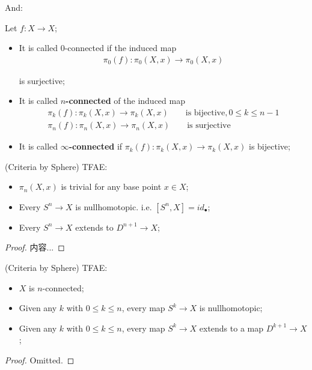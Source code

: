 \documentclass[Total.tex]{subfiles}
\begin{document}
			And:
			\begin{Def} Let $f:X\rightarrow X$;
				\begin{itemize}
					\item It is called $0$-connected if the induced map 
					\begin{gather*}
						\pi_0(f):\pi_0(X,x)\rightarrow \pi_0(X,x)
					\end{gather*}
					
					is surjective;
					\item It is called \textbf{$n$-connected} of the induced map
					\begin{gather*}
						\pi_k(f):\pi_k(X,x)\rightarrow \pi_k(X,x)\qquad\mbox{is bijective},0\leq k\leq n-1\\
						\pi_n(f):\pi_n(X,x)\rightarrow \pi_n(X,x)\qquad\mbox{is surjective}
					\end{gather*}
					\item It is called \textbf{$\infty$-connected} if $\pi_k(f):\pi_k(X,x)\rightarrow \pi_k(X,x)$ is bijective;
				\end{itemize}
			\end{Def}
			
			\begin{proposition}
				(Criteria by Sphere) TFAE:
				\begin{itemize}
					\item $\pi_n(X,x)$ is trivial for any base point $x\in X$;
					\item Every $S^n\rightarrow X$ is nullhomotopic. i.e. $[S^n,X]=id_\bullet$;
					\item Every $S^n\rightarrow X$ extends to $D^{n+1}\rightarrow X$;
				\end{itemize}
			\end{proposition}
			\begin{proof}
				内容...
			\end{proof}
			
			\begin{corollary}
				(Criteria by Sphere) TFAE:
				\begin{itemize}
					\item $X$ is $n$-connected;
					\item Given any $k$ with $0\leq k\leq n$, every map $S^k\rightarrow X$ is nullhomotopic;
					\item Given any $k$ with $0\leq k\leq n$, every map $S^k\rightarrow X$ extends to a map $D^{k+1}\rightarrow X$;
				\end{itemize}
			\end{corollary}
			\begin{proof}
				Omitted. 
			\end{proof}
			
\end{document}
